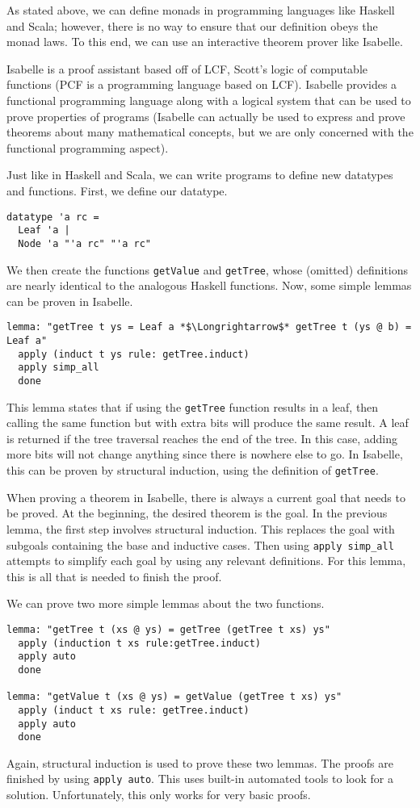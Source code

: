 As stated above, we can define monads in programming languages like Haskell and Scala; however, there is no way to ensure that our definition obeys the monad laws.  To this end, we can use an interactive theorem prover like Isabelle.

Isabelle is a proof assistant based off of LCF, Scott's logic of computable functions (PCF is a programming language based on LCF).  Isabelle provides a functional programming language along with a logical system that can be used to prove properties of programs (Isabelle can actually be used to express and prove theorems about many mathematical concepts, but we are only concerned with the functional programming aspect).

Just like in Haskell and Scala, we can write programs to define new datatypes and functions.  First, we define our datatype.
\begin{lstlisting}[language=Isabelle]
datatype 'a rc = 
  Leaf 'a |
  Node 'a "'a rc" "'a rc"
\end{lstlisting}
We then create the functions \texttt{getValue} and \texttt{getTree}, whose (omitted) definitions are nearly identical to the analogous Haskell functions.  Now, some simple lemmas can be proven in Isabelle.
\begin{lstlisting}[language=Isabelle]
lemma: "getTree t ys = Leaf a *$\Longrightarrow$* getTree t (ys @ b) = Leaf a"
  apply (induct t ys rule: getTree.induct)
  apply simp_all
  done
\end{lstlisting}
This lemma states that if using the \texttt{getTree} function results in a leaf, then calling the same function but with extra bits will produce the same result.  A leaf is returned if the tree traversal reaches the end of the tree.  In this case, adding more bits will not change anything since there is nowhere else to go.  In Isabelle, this can be proven by structural induction, using the definition of \texttt{getTree}.

When proving a theorem in Isabelle, there is always a current goal that needs to be proved.  At the beginning, the desired theorem is the goal.  In the previous lemma, the first step involves structural induction.  This replaces the goal with subgoals containing the base and inductive cases.  Then using \texttt{apply simp\_all} attempts to simplify each goal by using any relevant definitions.  For this lemma, this is all that is needed to finish the proof.

We can prove two more simple lemmas about the two functions.
\begin{lstlisting}[language=Isabelle]
lemma: "getTree t (xs @ ys) = getTree (getTree t xs) ys"
  apply (induction t xs rule:getTree.induct)
  apply auto
  done
  
lemma: "getValue t (xs @ ys) = getValue (getTree t xs) ys"
  apply (induct t xs rule: getTree.induct)
  apply auto
  done
\end{lstlisting}
Again, structural induction is used to prove these two lemmas.  The proofs are finished by using \texttt{apply auto}.  This uses built-in automated tools to look for a solution.  Unfortunately, this only works for very basic proofs.

